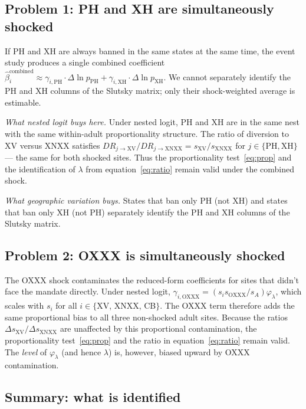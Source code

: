 \documentclass{article}
\begin{document}
\subsection{Problem 1: PH and XH are simultaneously shocked}

If PH and XH are always banned in the same states at the same time, the
event study produces a single combined coefficient $\hat\beta_i^{\mathrm{combined}}
\approx \gamma_{i,\mathrm{PH}} \cdot \Delta\ln p_{\mathrm{PH}} +
\gamma_{i,\mathrm{XH}} \cdot \Delta\ln p_{\mathrm{XH}}$.  We cannot separately
identify the PH and XH columns of the Slutsky matrix; only their
shock-weighted average is estimable.

\medskip\noindent\textit{What nested logit buys here.}  Under nested logit, PH and
XH are in the same nest with the same within-adult proportionality structure.
The ratio of diversion to XV versus XNXX satisfies
$DR_{j \to \mathrm{XV}}/DR_{j \to \mathrm{XNXX}} = s_{\mathrm{XV}}/s_{\mathrm{XNXX}}$
for $j \in \{\mathrm{PH},\mathrm{XH}\}$ --- the same for both shocked sites.
Thus the proportionality test~\eqref{eq:prop} and the identification of
$\lambda$ from equation~\eqref{eq:ratio} remain valid under the combined shock.

\medskip\noindent\textit{What geographic variation buys.}  States that ban
only PH (not XH) and states that ban only XH (not PH) separately identify the
PH and XH columns of the Slutsky matrix.

\subsection{Problem 2: OXXX is simultaneously shocked}

The OXXX shock contaminates the reduced-form coefficients for sites
that didn't face the mandate directly.  Under nested logit,
$\gamma_{i,\mathrm{OXXX}} = (s_i s_{\mathrm{OXXX}}/s_A)\varphi_\lambda$,
which scales with $s_i$ for all $i \in \{$XV, XNXX, CB$\}$.  The OXXX term
therefore adds the same proportional bias to all three non-shocked adult
sites.  Because the ratios $\Delta s_{\mathrm{XV}}/\Delta s_{\mathrm{XNXX}}$
are unaffected by this proportional contamination, the proportionality
test~\eqref{eq:prop} and the ratio in equation~\eqref{eq:ratio} remain valid.
The \emph{level} of $\varphi_\lambda$ (and hence $\lambda$) is, however,
biased upward by OXXX contamination.

\subsection{Summary: what is identified}
\end{document}
